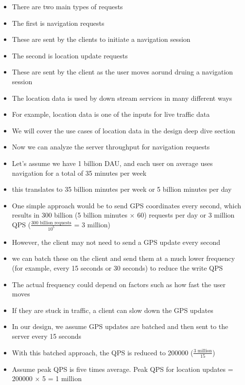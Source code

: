 \documentclass{report}
\theoremstyle{definition}
\begin{document}
\begin{itemize}
\item
There are two main types of requests
\item
The first is navigation requests
\item
These are sent by the clients to initiate a navigation session
\item
The second is location update requests
\item
These are sent by the client as the user moves aorund druing a navigation session
\item
The location data is used by down stream services in many different ways
\item
For example, location data is one of the inputs for live traffic data
\item
We will cover the use cases of location data in the design deep dive section
\item
Now we can analyze the server throughput for navigation requests
\item
Let's assume we have 1 billion DAU, and each user on average uses navigation for a total of 35 minutes per week
\item
this translates to 35 billion minutes per week or 5 billion minutes per day
\item
One simple approach would be to send GPS coordinates every second, which results in 300 billion (5 billion minutes $\times$ 60) requests per day or 3 million QPS ($\frac{300 \text{ billion requests}}{10^5}$ = 3 million)
\item
However, the client may not need to send a GPS update every second
\item
we can batch these on the client and send them at a much lower frequency (for example, every 15 seconds or 30 seconds) to reduce the write QPS
\item
The actual frequency  could depend on factors such as how fast the user moves
\item
If they are stuck in traffic, a client can slow down the GPS updates
\item
In our design, we assume GPS updates are batched and then sent to the server every 15 seconds
\item
With this batched approach, the QPS is reduced to 200000 ($\frac{3 \text{ million}}{15}$)
\item
Assume peak QPS is five times average. Peak QPS for location updates = 200000 $\times$ 5 = 1 million
\end{itemize}
\end{document}
